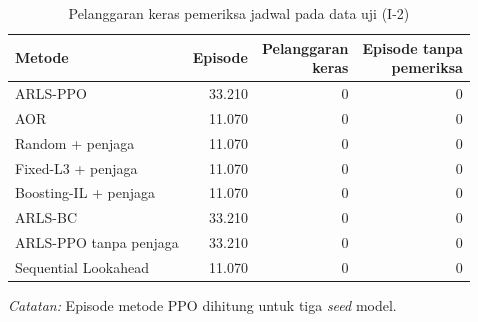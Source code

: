 \begin{table}[htbp]
\caption{Pelanggaran keras pemeriksa jadwal pada data uji (I-2)}
\label{tab:uji-layak}
\centering\footnotesize
\setlength{\tabcolsep}{4pt}
\begin{adjustbox}{max width=\textwidth}
\begin{tabular}{lrrr}
\toprule
Metode & Episode & \shortstack[r]{Pelanggaran\\keras} & \shortstack[r]{Episode tanpa\\pemeriksa} \\
\midrule
ARLS-PPO & 33.210 & 0 & 0 \\
AOR & 11.070 & 0 & 0 \\
Random + penjaga & 11.070 & 0 & 0 \\
Fixed-L3 + penjaga & 11.070 & 0 & 0 \\
Boosting-IL + penjaga & 11.070 & 0 & 0 \\
ARLS-BC & 33.210 & 0 & 0 \\
ARLS-PPO tanpa penjaga & 33.210 & 0 & 0 \\
Sequential Lookahead & 11.070 & 0 & 0 \\
\bottomrule
\end{tabular}
\end{adjustbox}
\par\smallskip\footnotesize\textit{Catatan:} Episode metode PPO dihitung untuk tiga \emph{seed} model.
\end{table}
